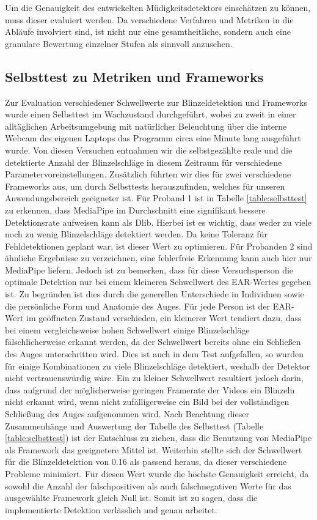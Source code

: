 Um die Genauigkeit des entwickelten Müdigkeitsdetektors einschätzen zu können, muss dieser evaluiert werden. Da verschiedene Verfahren und Metriken in die Abläufe involviert sind, ist nicht nur eine gesamtheitliche, sondern auch eine granulare Bewertung einzelner Stufen als sinnvoll anzusehen. 

\subsection{Selbsttest zu Metriken und Frameworks}
\label{subsec:selftest}
Zur Evaluation verschiedener Schwellwerte zur Blinzeldetektion und Frameworks wurde einen Selbsttest im Wachzustand durchgeführt, wobei zu zweit in einer alltäglichen Arbeitsumgebung mit natürlicher Beleuchtung über die interne Webcam des eigenen Laptops das Programm circa eine Minute lang ausgeführt wurde. Von diesen Versuchen entnahmen wir die selbstgezählte reale und die detektierte Anzahl der Blinzelschläge in diesem Zeitraum für verschiedene Parametervoreinstellungen. Zusätzlich führten wir dies für zwei verschiedene Frameworks aus, um durch Selbsttests herauszufinden, welches für unseren Anwendungsbereich geeigneter ist. Für Proband 1 ist in Tabelle \ref{table:selbsttest} zu erkennen, dass MediaPipe im Durchschnitt eine signifikant bessere Detektionsrate aufweisen kann als Dlib. Hierbei ist es wichtig, dass weder zu viele noch zu wenig Blinzelschläge detektiert werden. Da keine Toleranz für Fehldetektionen geplant war, ist dieser Wert zu optimieren. Für Probanden 2 sind ähnliche Ergebnisse zu verzeichnen, eine fehlerfreie Erkennung kann auch hier nur MediaPipe liefern. Jedoch ist zu bemerken, dass für diese Versuchsperson die optimale Detektion nur bei einem kleineren Schwellwert des EAR-Wertes gegeben ist. Zu begründen ist dies durch die generellen Unterschiede in Individuen sowie die persönliche Form und Anatomie des Auges. Für jede Person ist der EAR-Wert im geöffneten Zustand verschieden, ein kleinerer Wert tendiert dazu, dass bei einem vergleichsweise hohen Schwellwert einige Blinzelschläge fälschlicherweise erkannt werden, da der Schwellwert bereits ohne ein Schließen des Auges unterschritten wird. Dies ist auch in dem Test aufgefallen, so wurden für einige Kombinationen zu viele Blinzelschläge detektiert, weshalb der Detektor nicht vertrauenswürdig wäre. Ein zu kleiner Schwellwert resultiert jedoch darin, dass aufgrund der möglicherweise geringen Framerate der Videos ein Blinzeln nicht erkannt wird, wenn nicht zufälligerweise ein Bild bei der vollständigen Schließung des Auges aufgenommen wird. Nach Beachtung dieser Zusammenhänge und Auswertung der Tabelle des Selbsttest (Tabelle \ref{table:selbsttest}) ist der Entschluss zu ziehen, dass die Benutzung von MediaPipe als Framework das geeignetere Mittel ist. Weiterhin stellte sich der Schwellwert für die Blinzeldetektion von 0.16 als passend heraus, da dieser verschiedene Probleme minimiert. Für diesen Wert wurde die höchste Genauigkeit erreicht, da sowohl die Anzahl der falschpositiven als auch falschnegativen Werte für das ausgewählte Framework gleich Null ist. Somit ist zu sagen, dass die implementierte Detektion verlässlich und genau arbeitet. 


